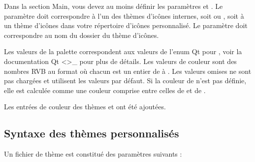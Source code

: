 \documentclass[a4paper,11pt,french]{sphinxmanual}
\begin{document}
\sphinxAtStartPar
Dans la section Main, vous devez au moins définir les paramètres  et . Le paramètre  doit correspondre à l’un des thèmes d’icônes internes, soit  ou , soit à un thème d’icônes dans votre répertoire d’icônes personnalisé. Le paramètre doit correspondre au nom du dossier du thème d’icônes.

\sphinxAtStartPar
Les valeurs de la palette correspondent aux valeurs de l’enum Qt pour , voir la documentation Qt \textless{}\textgreater{}\textasciigrave{}\_ pour plus de détails. Les valeurs de couleur sont des nombres RVB au format  où chacun est un entier de  à . Les valeurs omises ne sont pas chargées et utilisent les valeurs par défaut. Si la couleur de  n’est pas définie, elle est calculée comme une couleur comprise entre celles de  et de .

\sphinxAtStartPar
{}Les entrées de couleur des thèmes  et  ont été ajoutées.


\subsection{Syntaxe des thèmes personnalisés}
\label{\detokenize{more_customise:custom-syntax-theme}}
\sphinxAtStartPar
Un fichier  de thème est constitué des paramètres suivants :
\end{document}
